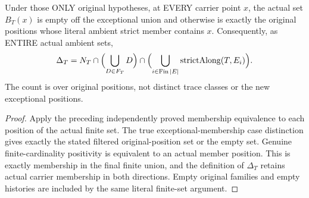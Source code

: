 \begin{theorem}
\label{hir:sharp-original-curve-actual-tauD-exact-support}
\leanok
Under those ONLY original hypotheses, at EVERY carrier point $x$, the
actual set $B_T(x)$ is empty off the exceptional union and otherwise is
exactly the original positions whose literal ambient strict member contains
$x$. Consequently, as ENTIRE actual ambient sets,
\[
 \Delta_T=N_T\cap\Bigl(\bigcup_{D\in F_T}D\Bigr)
                 \cap\Bigl(\bigcup_{i\in\operatorname{Fin}|E|}
                       \operatorname{strictAlong}(T,E_i)\Bigr).
\]
The count is over original positions, not distinct trace classes or the
new exceptional positions.
\end{theorem}
\begin{proof}
Apply the preceding independently proved membership equivalence to each
position of the actual finite set. The true exceptional-membership case
distinction gives exactly the stated filtered original-position set or
the empty set. Genuine finite-cardinality positivity is equivalent to an
actual member position. This is exactly membership in the final finite
union, and the definition of $\Delta_T$ retains actual carrier membership
in both directions. Empty original families and empty histories are
included by the same literal finite-set argument.
\end{proof}


